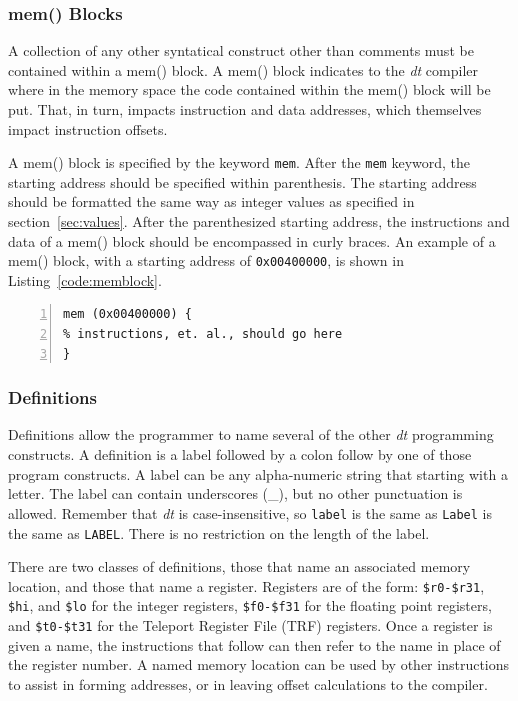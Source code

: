 \subsubsection{mem() Blocks}

A collection of any other syntatical construct other 
than comments must be contained within a mem() block.  
A mem() block indicates to the \emph{dt} compiler where
in the memory space the code contained within the mem() block
will be put.  That, in turn, impacts instruction and data
addresses, which themselves impact instruction offsets.

A mem() block is specified by the keyword \texttt{mem}. After 
the \texttt{mem} keyword, the starting address should be specified
within parenthesis.  The starting address should be formatted the 
same way as integer values as specified in section~\ref{sec:values}.
After the parenthesized starting address, the instructions and data of 
a mem() block 
should be encompassed in curly braces.  An example of a mem() 
block, with a starting address of \texttt{0x00400000}, is shown 
in Listing~\ref{code:memblock}.

\begin{lstlisting}[label=code:memblock,caption=Code example of a mem() block,basicstyle=\footnotesize,numbers=left,numberstyle=\tiny,stepnumber=1, numbersep=6pt,frame=single,captionpos=b,escapechar=@]
mem (0x00400000) {
% instructions, et. al., should go here 
}
\end{lstlisting}

\subsubsection{Definitions}

Definitions allow the programmer to name several of the
other \emph{dt} programming constructs.  A definition is 
a label followed by a colon follow by one of those 
program constructs.  A label can be any alpha-numeric 
string that starting with a letter.  The label can 
contain underscores (\_), but no other punctuation is 
allowed.  Remember that \emph{dt} is case-insensitive, 
so \texttt{label} is the same as \texttt{Label} is the 
same as \texttt{LABEL}.  There is no restriction on 
the length of the label.

There are two classes of definitions, those that 
name an associated memory location, and those that
name a register.  Registers are of the form: \texttt{\$r0-\$r31},
\texttt{\$hi}, and \texttt{\$lo} for the integer registers, 
\texttt{\$f0-\$f31} for the floating point registers, and 
\texttt{\$t0-\$t31} for the Teleport Register File (TRF) registers.
Once a register is given a name, the instructions that follow
can then refer to the name in place of the register number.
A named memory location can be used by other instructions
to assist in forming addresses, or in leaving offset
calculations to the compiler.

